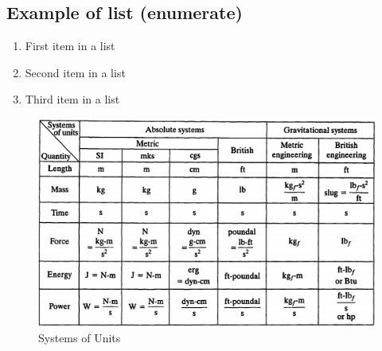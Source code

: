 \documentclass[paper=a4, fontsize=11pt]{scrartcl} %
\numberwithin{equation}{section} %
\numberwithin{figure}{section} %
\numberwithin{table}{section} %
\begin{document}

\subsection{Example of list (enumerate)}
\begin{enumerate}
\item First item in a list 
\item Second item in a list 
\item Third item in a list
\end{enumerate}



\begin{figure}
  \includegraphics[width=40em]{System_of_Units.png}
  \caption{Systems of Units}
  \label{fig:boat1}
\end{figure}
\end{document}
